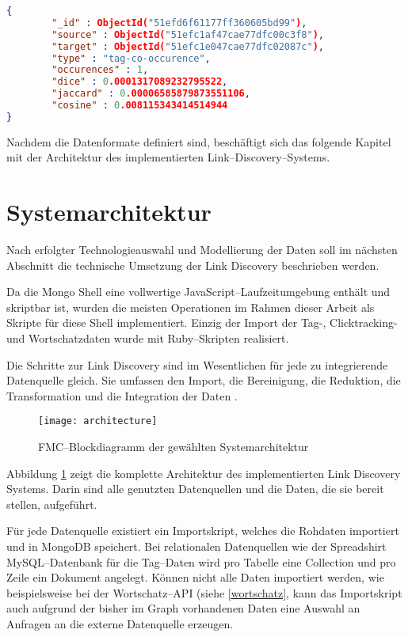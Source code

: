 \begin{lstlisting}[language=json, label={lst:edge_json}, caption={Kantendokument in JSON}]
{
        "_id" : ObjectId("51efd6f61177ff360605bd99"),
        "source" : ObjectId("51efc1af47cae77dfc00c3f8"),
        "target" : ObjectId("51efc1e047cae77dfc02087c"),
        "type" : "tag-co-occurence",
        "occurences" : 1,
        "dice" : 0.0001317089232795522,
        "jaccard" : 0.00006585879873551106,
        "cosine" : 0.008115343414514944
}
\end{lstlisting}

Nachdem die Datenformate definiert sind, beschäftigt sich das folgende Kapitel mit der Architektur des implementierten Link--Discovery--Systems.

\section{Systemarchitektur}

Nach erfolgter Technologieauswahl und Modellierung der Daten soll im nächsten Abschnitt die technische Umsetzung der Link Discovery beschrieben werden.

Da die Mongo Shell eine vollwertige JavaScript--Laufzeitumgebung enthält und skriptbar ist, wurden die meisten Operationen im Rahmen dieser Arbeit als Skripte für diese Shell implementiert. Einzig der Import der Tag-, Clicktracking- und Wortschatzdaten wurde mit Ruby--Skripten realisiert.

Die Schritte zur Link Discovery sind im Wesentlichen für jede zu integrierende Datenquelle gleich. Sie umfassen den Import, die Bereinigung, die Reduktion, die Transformation und die Integration der Daten \cite{hkp2012}.

\begin{figure}
\centering
\texttt{[image: architecture]}
\caption{FMC--Blockdiagramm der gewählten Systemarchitektur}
\label{fig:architecture}
\end{figure}

Abbildung \ref{fig:architecture} zeigt die komplette Architektur des implementierten Link Discovery Systems. Darin sind alle genutzten Datenquellen und die Daten, die sie bereit stellen, aufgeführt.

Für jede Datenquelle existiert ein Importskript, welches die Rohdaten importiert und in MongoDB speichert. Bei relationalen Datenquellen wie der Spreadshirt MySQL--Datenbank für die Tag--Daten wird pro Tabelle eine Collection und pro Zeile ein Dokument angelegt. Können nicht alle Daten importiert werden, wie beispielsweise bei der Wortschatz--API (siehe \ref{wortschatz}, kann das Importskript auch aufgrund der bisher im Graph vorhandenen Daten eine Auswahl an Anfragen an die externe Datenquelle erzeugen.

